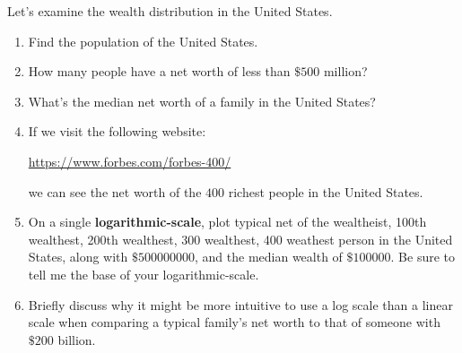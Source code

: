 \documentclass[noauthor,nooutcomes,handout,hints,12pt]{ximera}
\begin{document}
\begin{question}
    Let's examine the wealth distribution in the United States.
    \begin{enumerate}
\item Find the population of the United States.
\item How many people have a net worth of less than $\$500$ million? 
\item What's the median net worth of a family in the United States?
\item  If we visit the following website:
\begin{center}
        \url{https://www.forbes.com/forbes-400/}
    \end{center}
    we can see the net worth of the $400$ richest people in the United States.
\item On a single \textbf{logarithmic-scale}, plot typical net of the wealtheist, 100th wealthest, 200th wealthest, 300 wealthest, 
        400 weathest person in the United States, along with $\$500000000$, and the median wealth of $\$100000$. Be sure to tell me the base of your logarithmic-scale.
              \begin{center}
                \end{center}
        \item Briefly discuss why it might be more intuitive to use a log scale
              than a linear scale when comparing a typical family's net worth
              to
              that of someone with \(\$200\) billion.
    \end{enumerate}

\end{question}
\end{document}

